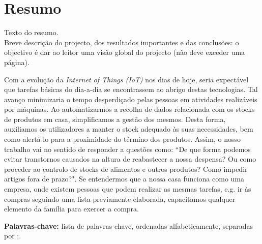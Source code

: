 \cleardoublepage\newpage
\chapter*{Resumo} \label{resumo}
Texto do resumo.\\

Breve descrição do projecto, dos resultados importantes e das conclusões: o objectivo é dar ao leitor uma visão global do projecto (não deve exceder uma página). 

Com a evolução da \textit{Internet of Things (IoT)} nos dias de hoje, seria expectável que tarefas básicas do dia-a-dia se encontrassem ao abrigo destas tecnologias. Tal avanço minimizaria o tempo desperdiçado pelas pessoas em atividades realizáveis por máquinas. Ao automatizarmos a recolha de dados relacionada com os stocks de produtos em casa, simplificamos a gestão dos mesmos. Desta forma, auxiliamos os utilizadores a manter o stock adequado às suas necessidades, bem como alertá-lo para a proximidade do término dos produtos. Assim, o nosso trabalho vai no sentido de responder a questões como: ``De que forma podemos evitar transtornos causados na altura de reabastecer a nossa despensa? Ou como proceder ao controlo de stocks de alimentos e outros produtos? Como impedir artigos fora de prazo?". Se entendermos que a nossa casa funciona como uma empresa, onde existem pessoas que podem realizar as mesmas tarefas, e.g. ir às compras seguindo uma lista previamente elaborada, capacitamos qualquer elemento da família para exercer a compra.

{\bf Palavras-chave:} lista de palavras-chave, ordenadas alfabeticamente, separadas por ;.